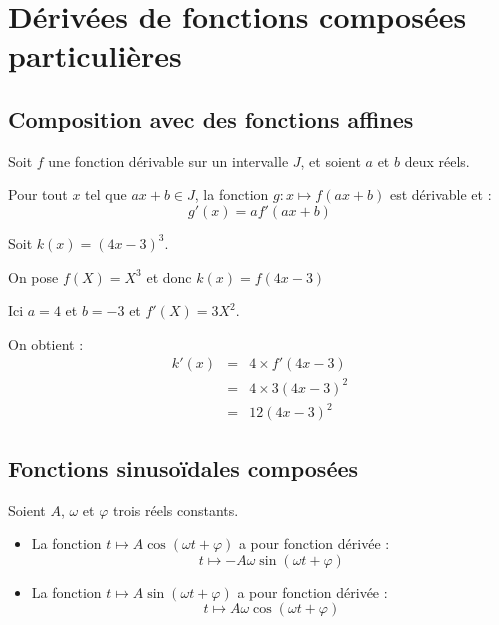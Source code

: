 \section{Dérivées de fonctions composées particulières}

\subsection{Composition avec des fonctions affines}

\begin{prop}[Dérivée de $f(ax+b)$]
	Soit $f$ une fonction dérivable sur un intervalle $J$, et soient $a$ et $b$ deux réels.

	Pour tout $x$ tel que $ax+b \in J$, la fonction $g : x \mapsto f(ax+b)$ est dérivable et :
	\[
		g'(x) = a f'(ax+b)
	\]
\end{prop}

\begin{ex}
	Soit $k(x) = (4x - 3)^3$.

	On pose $f(X) = X^3$ et donc $k(x)=f(4x-3)$

	Ici $a = 4$ et $b = -3$ et $f'(X) = 3X^2$.

	On obtient :
	\[
		\begin{array}{rcl}
			k'(x) & = & 4\times f'(4x - 3)   \\
			      & = & 4 \times 3(4x - 3)^2 \\
			      & = & 12(4x - 3)^2
		\end{array}
	\]
\end{ex}

\subsection{Fonctions sinusoïdales composées}

\begin{prop}
	Soient $A$, $\omega$ et $\varphi$ trois réels constants.
	\begin{itemize}
		\item La fonction $t \mapsto A \cos(\omega t + \varphi)$ a pour fonction dérivée :
		      \[
			      t \mapsto -A\omega \sin(\omega t + \varphi)
		      \]
		\item La fonction $t \mapsto A \sin(\omega t + \varphi)$ a pour fonction dérivée :
		      \[
			      t \mapsto A\omega \cos(\omega t + \varphi)
		      \]
	\end{itemize}
\end{prop}

